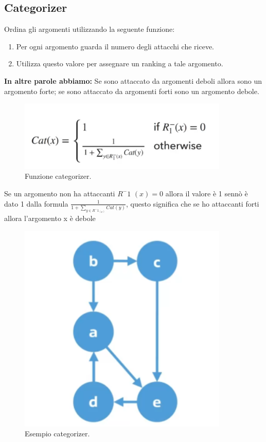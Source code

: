 \subsection{Categorizer}
Ordina gli argomenti utilizzando la seguente funzione:
\begin{enumerate}
    \item Per ogni argomento guarda il numero degli attacchi che riceve.
    \item Utilizza questo valore per assegnare un ranking a tale argomento.
\end{enumerate}
\textbf{In altre parole abbiamo:} Se sono attaccato da argomenti deboli allora sono un argomento forte; se sono attaccato da argomenti forti sono un argomento debole.
\begin{figure}[htp]
	\centering
    \includegraphics[width=10cm, keepaspectratio]{img/Cap8/quantitativo1.png}
    \caption{Funzione categorizer.}
\end{figure}
Se un argomento non ha attaccanti $R^-1$ $(x) = 0$ allora il valore è 1 sennò è dato 1 dalla formula
$\frac{1}{1+\sum_{y\in R^-1_(x)} Cat(y)}$, questo significa che se ho attaccanti forti allora l’argomento x è debole
\newpage
\begin{figure}[htp]
	\centering
    \includegraphics[width=10cm, keepaspectratio]{img/Cap8/quantitativo2.png}
    \caption{Esempio categorizer.}
\end{figure}
